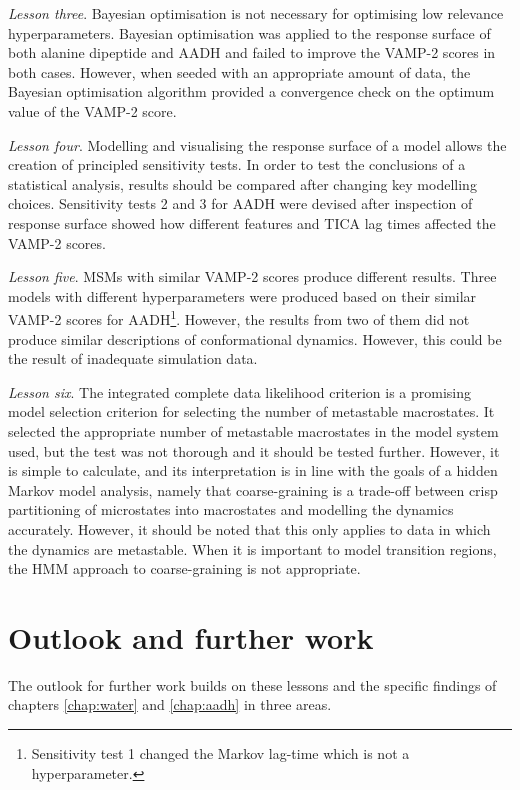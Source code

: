 \emph{Lesson three}.  Bayesian optimisation is not necessary for optimising low relevance hyperparameters.  Bayesian optimisation was applied to the response surface of both alanine dipeptide and AADH and failed to improve the VAMP-2 scores in both cases. However, when seeded with an appropriate amount of data, the Bayesian optimisation algorithm provided a convergence check on the optimum value of the VAMP-2 score.  

\emph{Lesson four}. Modelling and visualising the response surface of a model allows the creation of principled sensitivity tests.  In order to test the conclusions of a statistical analysis, results should be compared after changing key modelling choices. Sensitivity tests 2 and 3 for AADH were devised after inspection of response surface showed how different features and TICA lag times affected the VAMP-2 scores.  

\emph{Lesson five}. MSMs with similar VAMP-2 scores produce different results.  Three models with different hyperparameters were produced based on their similar VAMP-2 scores for AADH\footnote{Sensitivity test 1 changed the Markov lag-time which is not a hyperparameter.}.  However, the results from two of them did not produce similar descriptions of conformational dynamics.  However, this could be the result of inadequate simulation data.  

\emph{Lesson six}.  The integrated complete data likelihood criterion is a promising model selection criterion for selecting the number of metastable macrostates.  It selected the appropriate number of metastable macrostates in the model system used, but the test was not thorough and it should be tested further.  However, it is simple to calculate, and its interpretation is in line with the goals of a hidden Markov model analysis, namely that coarse-graining is a trade-off between crisp partitioning of microstates into macrostates and modelling the dynamics accurately. However, it should be noted that this only applies to data in which the dynamics are metastable. When it is important to model transition regions, the HMM approach to coarse-graining is not appropriate. 


\section{Outlook and further work}
The outlook for further work builds on these lessons and the specific findings of chapters \ref{chap:water} and \ref{chap:aadh} in three areas. 

